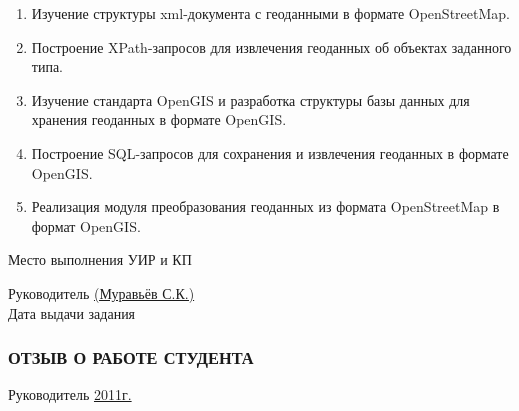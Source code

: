 \documentclass[12pt,a4paper,oneside]{article} %
\begin{document}
{ \fontsize{14pt}{20pt}
\selectfont
\begin{enumerate}
\item Изучение структуры xml-документа с геоданными в формате \linebreak
OpenStreetMap.
\item Построение XPath-запросов для извлечения геоданных об объектах \linebreak
заданного типа.
\item Изучение стандарта OpenGIS и разработка структуры базы \linebreak
данных для хранения геоданных в формате OpenGIS.
\item Построение SQL-запросов для сохранения и извлечения геоданных \linebreak
в формате OpenGIS.
\item Реализация модуля преобразования геоданных из формата \linebreak
OpenStreetMap в формат OpenGIS.
\end{enumerate}}

\newpage
\begin{flushleft}
{ \fontsize{12pt}{20pt}
\selectfont
Место выполнения УИР и КП \underline{\hspace{11cm}}

Руководитель \underline{\hspace{10,9cm} (Муравьёв С.К.)}
\\[10pt]
Дата выдачи задания \underline{\hspace{12,8cm}}}
\end{flushleft}

\newpage
\subsubsection*{ОТЗЫВ О РАБОТЕ СТУДЕНТА}

\vfill
Руководитель \underline{\hspace{8cm}\glqq{\hspace{1cm}}\grqq\hspace{4cm}2011г.}
\end{document}
